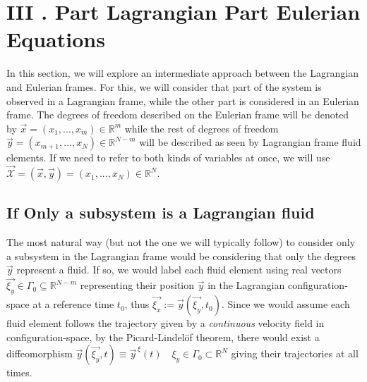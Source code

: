 \documentclass[11pt, a4paper]{article} %
\newcommand{\R}{\mathbb{R}} %
\newcommand{\x}{\mathcal{X}}
\begin{document}




\newpage

\section*{III . Part Lagrangian Part Eulerian Equations \vspace{-0.2cm}}
In this section, we will explore an intermediate approach between the Lagrangian and Eulerian frames. For this, we will consider that part of the system is observed in a Lagrangian frame, while the other part is considered in an Eulerian frame. The degrees of freedom described on the Eulerian frame will be denoted by $\vec{x}=(x_1,...,x_m)\in\R^m$ while the rest of degrees of freedom $\vec{y}=(x_{m+1},...,x_N)\in\R^{N-m}$ will be described as seen by Lagrangian frame fluid elements. If we need to refer to both kinds of variables at once, we will use $\vec{\x}=(\vec{x}, \vec{y})=(x_1,...,x_N)\in \R^N$.\vspace{-0.4cm}

\subsection*{If Only a subsystem is a Lagrangian fluid\vspace{-0.3cm}}

The most natural way (but not the one we will typically follow) to consider only a subsystem in the Lagrangian frame would be considering that only the degrees $\vec{y}$ represent a fluid. If so, we would label each fluid element using real vectors $\vec{\xi_y}\in\Gamma_0\subseteq \R^{N-m}$ representing their position $\vec{y}$ in the Lagrangian configuration-space at a reference time $t_0$, thus $\vec{\xi_x}:=\vec{y}( \vec{\xi_y},t_0)$. Since we would assume each fluid element follows the trajectory given by a {\em continuous} velocity field in configuration-space, by the Picard-Lindelöf theorem, there would exist a diffeomorphism $\vec{y}(\vec{\xi_y},t)\equiv \vec{y}^{\, \xi}(t) \quad \xi_y \in \Gamma_0 \subset \R^N$ giving their trajectories at all times. \vspace{-0.4cm}
\end{document}
